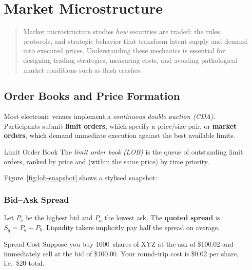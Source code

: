 \chapter{Market Microstructure}\label{ch:microstructure}

\begin{abstract}
Market microstructure studies \emph{how} securities are traded:
the rules, protocols, and strategic behavior that transform latent supply
and demand into executed prices.  
Understanding these mechanics is essential for designing trading strategies,
measuring costs, and avoiding pathological market conditions such as flash crashes.
\end{abstract}

\section{Order Books and Price Formation}

Most electronic venues implement a \emph{continuous double auction (CDA)}.
Participants submit \textbf{limit orders}, which specify a price/size pair,
or \textbf{market orders}, which demand immediate execution
against the best available limits.

\begin{definition}{Limit Order Book}{}
The \emph{limit order book (LOB)} is the queue of outstanding limit orders,
ranked by price and (within the same price) by time priority.
\end{definition}

Figure~\ref{fig:lob-snapshot} shows a stylised snapshot:
\begin{center}
\end{center}

\subsection{Bid–Ask Spread}

Let \(P_b\) be the highest bid and \(P_a\) the lowest ask.
The \textbf{quoted spread} is \(S_q = P_a - P_b\).
Liquidity takers implicitly pay half the spread on average.

\begin{example}{Spread Cost}{}
Suppose you buy \SI{1000}{shares} of XYZ at the ask of \$100.02
and immediately sell at the bid of \$100.00.
Your round‑trip cost is \$0.02 per share, i.e.\ \$20 total. \qedhere
\end{example}

